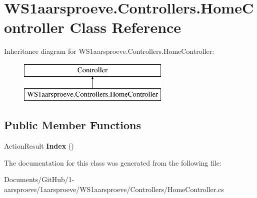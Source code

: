 \hypertarget{class_w_s1aarsproeve_1_1_controllers_1_1_home_controller}{}\section{W\+S1aarsproeve.\+Controllers.\+Home\+Controller Class Reference}
\label{class_w_s1aarsproeve_1_1_controllers_1_1_home_controller}
Inheritance diagram for W\+S1aarsproeve.\+Controllers.\+Home\+Controller\+:\begin{figure}[H]
\begin{center}
\leavevmode
\includegraphics[height=2.000000cm]{class_w_s1aarsproeve_1_1_controllers_1_1_home_controller}
\end{center}
\end{figure}
\subsection*{Public Member Functions}
\begin{DoxyCompactItemize}
\item 
\hypertarget{class_w_s1aarsproeve_1_1_controllers_1_1_home_controller_ac3c28eede33f9294e14e8bbb6d548ffa}{}Action\+Result {\bfseries Index} ()\label{class_w_s1aarsproeve_1_1_controllers_1_1_home_controller_ac3c28eede33f9294e14e8bbb6d548ffa}

\end{DoxyCompactItemize}


The documentation for this class was generated from the following file\+:\begin{DoxyCompactItemize}
\item 
Documents/\+Git\+Hub/1-\/aarsproeve/1aarsproeve/\+W\+S1aarsproeve/\+Controllers/Home\+Controller.\+cs\end{DoxyCompactItemize}
